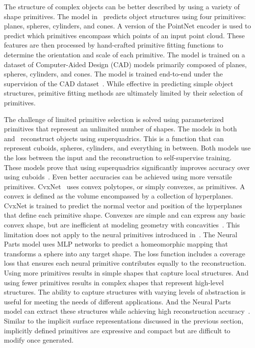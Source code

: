 The structure of complex objects can be better described by using a variety of shape primitives. The model in~\cite{Li2019} predicts object structures using four primitives: planes, spheres, cylinders, and cones. A version of the PointNet encoder is used to predict which primitives encompass which points of an input point cloud. These features are then processed by hand-crafted primitive fitting functions to determine the orientation and scale of each primitive. The model is trained on a dataset of Computer-Aided Design (CAD) models primarily composed of planes, spheres, cylinders, and cones. The model is trained end-to-end under the supervision of the CAD dataset~\cite{Li2019}. While effective in predicting simple object structures, primitive fitting methods are ultimately limited by their selection of primitives.

The challenge of limited primitive selection is solved using parameterized primitives that represent an unlimited number of shapes. The models in both~\cite{Paschalidou2019} and~\cite{Paschalidou2020} reconstruct objects using superquadrics. This is a function that can represent cuboids, spheres, cylinders, and everything in between. Both models use the loss between the input and the reconstruction to self-supervise training. These models prove that using superquadrics significantly improves accuracy over using cuboids~\cite{Paschalidou2019}. Even better accuracies can be achieved using more versatile primitives. CvxNet~\cite{Deng2020} uses convex polytopes, or simply convexes, as primitives. A convex is defined as the volume encompassed by a collection of hyperplanes. CvxNet is trained to predict the normal vector and position of the hyperplanes that define each primitive shape. Convexes are simple and can express any basic convex shape, but are inefficient at modeling geometry with concavities~\cite{Deng2020}. This limitation does not apply to the neural primitives introduced in~\cite{Paschalidou2021}. The Neural Parts model uses MLP networks to predict a homeomorphic mapping that transforms a sphere into any target shape. The loss function includes a coverage loss that ensures each neural primitive contributes equally to the reconstruction. Using more primitives results in simple shapes that capture local structures. And using fewer primitives results in complex shapes that represent high-level structures. The ability to capture structures with varying levels of abstraction is useful for meeting the needs of different applications. And the Neural Parts model can extract these structures while achieving high reconstruction accuracy~\cite{Paschalidou2021}. Similar to the implicit surface representations discussed in the previous section, implicitly defined primitives are expressive and compact but are difficult to modify once generated.

